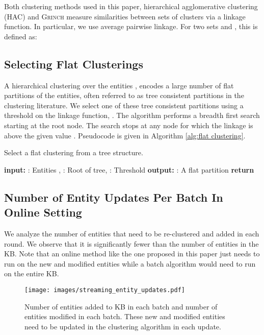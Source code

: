 \documentclass[11pt,a4paper]{article}
\begin{document}
Both clustering methods used in this paper, 
hierarchical agglomerative clustering (HAC) and
\textsc{Grinch} measure similarities between sets 
of clusters via a linkage function. In particular, 
we use average pairwise linkage. For two sets  and ,
this is defined as:


\subsection{Selecting Flat Clusterings}
\label{sub:appendix_flat_cluster}
A hierarchical clustering  over the entities ,
encodes a large number of flat partitions of the entities, 
often referred to as tree consistent partitions in the clustering 
literature. We select one of these tree consistent partitions 
using a threshold on the linkage function, . The algorithm performs 
a breadth first search starting at the root node. The search stops
at any node for which the linkage is above the given value . 
Pseudocode is given in Algorithm \ref{alg:flat clustering}.

\begin{algorithm}[t]
\caption{Select a flat clustering from a tree structure.}
\begin{algorithmic}[1]
\State \textbf{input:} { : Entities , : Root of tree, : Threshold}
\State \textbf{output:} {: A flat partition}
\State 
\State 
{}
\State 
\IF{}
\State 
\ELSE
{}
\State 
\ENDFOR
\ENDIF
\ENDWHILE
\State \textbf{return} 
\end{algorithmic}
\label{alg:flat clustering}
\end{algorithm}

\subsection{Number of Entity Updates Per Batch In Online Setting}

We analyze the number of entities that need to be re-clustered and
added in each round. We observe that it is significantly fewer 
than the number of entities in the KB. Note that an online method like
the one proposed in this paper just needs to run on the new and modified 
entities while a batch algorithm would need to run on the entire KB.

\begin{figure}
    \centering
    \texttt{[image: images/streaming\_entity\_updates.pdf]}
    \caption{Number of entities added to KB in each batch and number of entities modified in each batch. These new and modified entities need to be updated in the clustering algorithm in each update.}
    \label{fig:streaming_up}
\end{figure}
\end{document}
